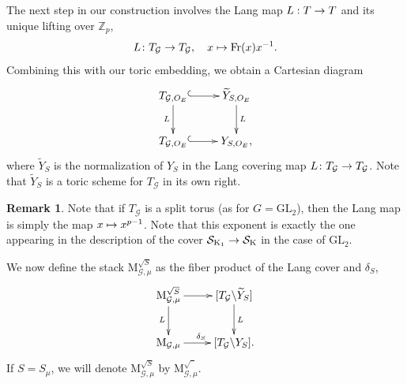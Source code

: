 \documentclass[reqno, 10pt]{amsart}
\makeatletter
\newcommand{\BZ}{\ensuremath{\mathbb {Z}}\xspace}
\newcommand{\CG}{\ensuremath{\mathcal {G}}\xspace}
\newcommand{\CS}{\ensuremath{\mathcal {S}}\xspace}
\newcommand{\RK}{\ensuremath{\mathrm {K}}\xspace}
\newcommand{\GL}{\mathrm{GL}}
\newcommand{\wt}{\widetilde}
\newcommand{\bs}{\backslash}
\theoremstyle{definition}
\newtheorem{remark}[subsubsection]{Remark}
\numberwithin{equation}{subsection}
\numberwithin{subsubsection}{subsection}
\renewcommand{\to}{%
   \ifbool{@display}{\longrightarrow}{\rightarrow}%
   }
\let\shortmapsto\mapsto
\renewcommand{\mapsto}{%
   \ifbool{@display}{\shortmapsto}{\shortmapsto}%
   }
\newcommand{\Mloc}{{\rm M}}
\newcommand{\Mlocroot}{{\mathrm M}^{\sqrt{S}}}
\newcommand{\Mlocrooto}{{\mathrm M}^{\sqrt{\phantom{a}}}}
\makeatother
\begin{document}
 
\subsection{}  The next step in our construction involves the Lang map $L: T\to T$ and its unique lifting over $\BZ_p$,
 \begin{equation}
 L\colon T_\CG\to  T_\CG,\quad x\mapsto {\rm Fr}(x)x^{-1} .
 \end{equation}
 Combining this with our toric embedding, we obtain  a Cartesian diagram
  \begin{equation*}\label{LangNormalization-intro}
\begin{aligned}
 \xymatrix{
        T _{\CG, O_{E} }\ar@{^{(}->}[r] \ar[d]_{L}  &  \wt Y_{S, O_E}  \ar[d]^L \\
        T_{\CG,  O_{E}} \ar@{^{(}->}[r]  & Y_{S,O_E} ,
        }
        \end{aligned}
\end{equation*}
 where  $\wt Y_{S}$ is the normalization of $ Y_{S}$ in the Lang covering map $L\colon T_{\CG}\to T_{\CG}$. Note that $\wt Y_{S}$ is a toric scheme for $T_\CG$ in its own right. 
 \begin{remark}
 Note that if $T_\CG$ is a split torus (as for $G=\GL_2$), then the Lang map is simply the map $x\mapsto x^{p-1}$. Note that this exponent is exactly the one appearing in the description of the cover $\CS_{\RK_1}\to\CS_\RK$ in the case of $\GL_2$. 
 \end{remark}
 We now define  the stack $\Mlocroot_{\CG,\mu}$ as the fiber product   of the Lang cover and $\delta_S$,
\begin{equation*}
\begin{aligned}
 \xymatrix{
      \Mlocroot_{\CG,\mu} \ar[r] \ar[d]_L  &   [T_\CG \bs \wt Y_S ] \ar[d]^L \\
       \Mloc_{\CG,\mu}\ar[r]^{\delta_S} &  [T_\CG \bs Y_S ]  .
        }
        \end{aligned}
\end{equation*}
 If $S=S_{\mu}$, we will  denote $\Mlocroot_{\CG,\mu}$ by $\Mlocrooto_{\CG,\mu}$.
 
\end{document}
